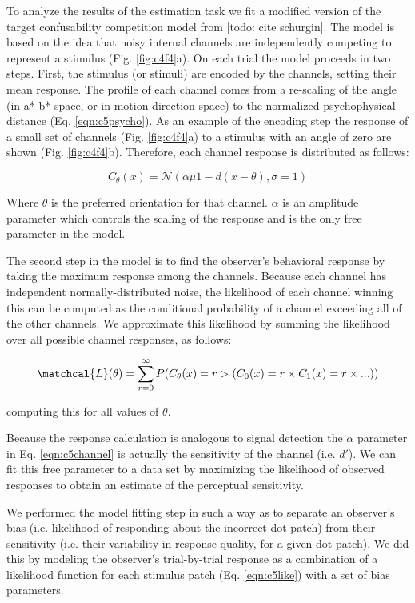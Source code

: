 To analyze the results of the estimation task we fit a modified version of the target confusability competition model from [todo: cite schurgin]. The model is based on the idea that noisy internal channels are independently competing to represent a stimulus (Fig. \ref{fig:c4f4}a). On each trial the model proceeds in two steps. First, the stimulus (or stimuli) are encoded by the channels, setting their mean response. The profile of each channel comes from a re-scaling of the angle (in a* b* space, or in motion direction space) to the normalized psychophysical distance (Eq. \ref{eqn:c5psycho}). As an example of the encoding step the response of a small set of channels (Fig. \ref{fig:c4f4}a) to a stimulus with an angle of zero are shown (Fig. \ref{fig:c4f4}b). Therefore, each channel response is distributed as follows:

\begin{equation}
    C_{\theta}(x) = \mathcal{N}(\alpha \mu1 - d(x-\theta),\sigma=1)
    \label{eqn:c5channel}
\end{equation}

Where $\theta$ is the preferred orientation for that channel. $\alpha$ is an amplitude parameter which controls the scaling of the response and is the only free parameter in the model.

The second step in the model is to find the observer's behavioral response by taking the maximum response among the channels. Because each channel has independent normally-distributed noise, the likelihood of each channel winning this can be computed as the conditional probability of a channel exceeding all of the other channels. We approximate this likelihood by summing the likelihood over all possible channel responses, as follows:

\begin{equation}
    \matchcal{L}(\theta) = \sum_{r=0}^{\infty} P(C_{\theta}(x)=r > (C_0(x)=r \times C_1(x)=r \times ...))
    \label{eqn:c5like}
\end{equation}

computing this for all values of $\theta$. 

Because the response calculation is analogous to signal detection the $\alpha$ parameter in Eq. \ref{eqn:c5channel} is actually the sensitivity of the channel (i.e. $d'$). We can fit this free parameter to a data set by maximizing the likelihood of observed responses to obtain an estimate of the perceptual sensitivity.

We performed the model fitting step in such a way as to separate an observer's bias (i.e. likelihood of responding about the incorrect dot patch) from their sensitivity (i.e. their variability in response quality, for a given dot patch). We did this by modeling the observer's trial-by-trial response as a combination of a likelihood function for each stimulus patch (Eq. \ref{eqn:c5like}) with a set of bias parameters.

